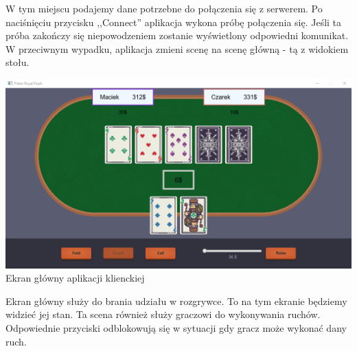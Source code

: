 \documentclass{article}
\begin{document}
        W tym miejscu podajemy dane potrzebne do połączenia się z serwerem.
        Po naciśnięciu przycisku ,,Connect'' aplikacja wykona próbę połączenia się.
        Jeśli ta próba zakończy się niepowodzeniem zostanie wyświetlony odpowiedni komunikat.
        W przeciwnym wypadku, aplikacja zmieni scenę na scenę główną - tą z widokiem stołu.
        
        \vspace{4mm}
        
        \begin{center}
            \includegraphics[width=\textwidth]{finished_gui_table.png}
            \\
            Ekran główny aplikacji klienckiej
        \end{center}
    
        Ekran główny służy do brania udziału w rozgrywce.
        To na tym ekranie będziemy widzieć jej stan.
        Ta scena również służy graczowi do wykonywania ruchów.
        Odpowiednie przyciski odblokowują się w sytuacji gdy gracz może wykonać dany ruch.
       
    
\end{document}
